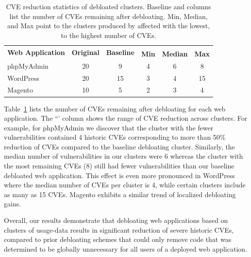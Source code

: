 \begin{table}[]
    \centering
    \caption{CVE reduction statistics of debloated clusters. Baseline and \sys{} columns list the number of CVEs remaining after debloating. Min, Median, and Max point to the clusters produced by \sys{} affected with the lowest, to the highest number of CVEs.}
    \label{tab:cve_reduction}
    \begin{tabular}{|l|c|c|ccc|}
    \hline
    \multirow{2}{*}{\textbf{Web Application}} & \multirow{2}{*}{\textbf{Original}} & \multirow{2}{*}{\textbf{Baseline}} & \multicolumn{3}{c|}{\textbf{\sys{}}}                        \\ \cline{4-6} 
                                     &                           &                            & \multicolumn{1}{c|}{\textbf{Min}} & \multicolumn{1}{c|}{\textbf{Median}} & \multicolumn{1}{c|}{\textbf{Max}} \\ \hline
    phpMyAdmin                       & 20                        & 9                          & \multicolumn{1}{c|}{4}   & \multicolumn{1}{c|}{6}      & 8   \\ \hline
    WordPress                        & 20                        & 15                         & \multicolumn{1}{c|}{3}   & \multicolumn{1}{c|}{4}      & 15  \\ \hline
    Magento                          & 10                        & 5                          & \multicolumn{1}{c|}{2}   & \multicolumn{1}{c|}{3}      & 4   \\ \hline
    \end{tabular}
\end{table}

Table~\ref{tab:cve_reduction} lists the number of CVEs remaining after debloating for each web application. 
The ``\sys{}' column shows the range of CVE reduction across clusters. 
For example, for phpMyAdmin we discover that the \sys{} cluster with the fewer vulnerabilities contained 4 historic CVEs corresponding to more than 50\% reduction of CVEs compared to the baseline debloating cluster. 
Similarly, the median number of vulnerabilities in our clusters were 6 whereas the cluster with the most remaining CVEs (8) still had fewer vulnerabilities than our baseline debloated web application. 
This effect is even more pronounced in WordPress where the median number of CVEs per cluster is 4, while certain clusters include as many as 15 CVEs. 
Magento exhibits a similar trend of localized debloating gains.

Overall, our results demonstrate that debloating web applications based on clusters of usage-data results in significant reduction of severe historic CVEs, compared to prior debloating schemes that could only remove code that was determined to be globally unnecessary for all users of a deployed web application.

